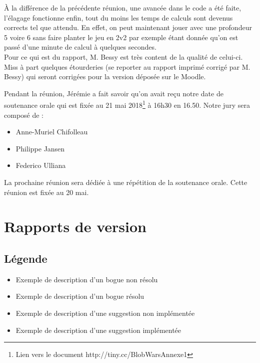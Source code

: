 \documentclass[11pt,a4paper]{article}
\begin{document}
    À la différence de la précédente réunion, une avancée dans le code a été faite, l'élagage fonctionne enfin, tout du moins les temps de calculs sont devenus corrects tel que attendu. En effet, on peut maintenant jouer avec une profondeur 5 voire 6 sans faire planter le jeu en 2v2 par exemple étant donnée qu'on est passé d'une minute de calcul à quelques secondes.\\
    
    Pour ce qui est du rapport, M. Bessy est très content de la qualité de celui-ci. Miss à part quelques étourderies (se reporter au rapport imprimé corrigé par M. Bessy) qui seront corrigées pour la version déposée sur le Moodle.
    
    Pendant la réunion, Jérémie a fait savoir qu'on avait reçu notre date de soutenance orale qui est fixée au 21 mai 2018\footnote{Lien vers le document http://tiny.cc/BlobWarsAnnexe1} à 16h30 en 16.50. Notre jury sera composé de :
    \begin{itemize}
        \item Anne-Muriel Chifolleau
        \item Philippe Jansen
        \item Federico Ulliana
    \end{itemize}
    
    La prochaine réunion sera dédiée à une répétition de la soutenance orale. Cette réunion est fixée au 20 mai.

    
\newpage

\section{Rapports de version}


\subsection{Légende}
%
\begin{itemize}[label=\CheckmarkBold, font=\color{rouge}]
    \item Exemple de description d'un bogue non résolu
\end{itemize}

%
\begin{itemize}[label=\CheckmarkBold, font=\color{vert}]
    \item Exemple de description d'un bogue résolu
\end{itemize}
%
\begin{itemize}[label=\Peace, font=\large \color{rouge}]
    \item Exemple de description d'une suggestion non implémentée
\end{itemize}
%
\begin{itemize}[label=\Peace, font=\large \color{vert}]
    \item Exemple de description d'une suggestion implémentée
\end{itemize}
\end{document}
